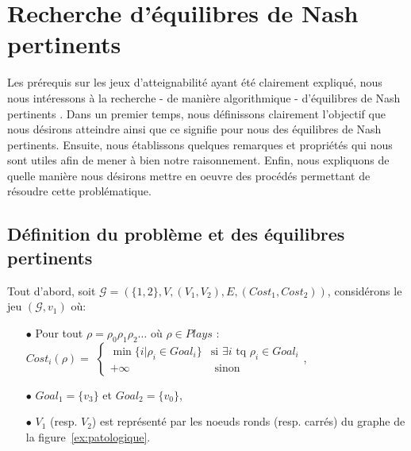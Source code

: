 
\section{Recherche d'équilibres de Nash pertinents}
\label{section:equilibrePert}

Les prérequis sur les jeux d'atteignabilité ayant été clairement expliqué, nous nous intéressons à la recherche - de manière algorithmique - d'équilibres de Nash \og pertinents \fg. Dans un premier temps, nous définissons clairement l'objectif que nous désirons atteindre ainsi que ce signifie pour nous des équilibres de Nash pertinents. Ensuite, nous établissons quelques remarques et propriétés qui nous sont utiles afin de mener à bien notre raisonnement. Enfin, nous expliquons de quelle manière nous désirons mettre en oeuvre des procédés permettant de résoudre cette problématique.

\subsection{Définition du problème et des équilibres pertinents}
\label{subsection:defEqPert}

Tout d'abord, soit $\mathcal{G} = ( \{ 1,2 \}, V, (V_{1}, V_{2}),E, (Cost _{1},Cost _{2}))$, considérons le jeu $(\mathcal{G},v_{1})$ où:\begin{enumerate}
\item[$\bullet$] Pour tout  $\rho = \rho _{0} \rho _{1} \rho _{2} \ldots $ où $\rho \in Plays$ :\\$Cost_{i}(\rho) = $ $\begin{cases} 
								\min \{ i | \rho _{i} \in Goal_{i} \} & \text{si } \exists i \text{ tq } \rho _{i} \in Goal_{i} \\
								+\infty & \text{ sinon}
								\end{cases}$,
\item[$\bullet$] $Goal_{1} = \{ v_{3} \}$ et $Goal_{2} = \{ v_{0} \}$,
\item[$\bullet$]  $V_{1}$ (resp. $V_{2}$) est représenté par les noeuds ronds (resp. carrés) du graphe de la figure~\ref{ex:patologique}.

\end{enumerate}


